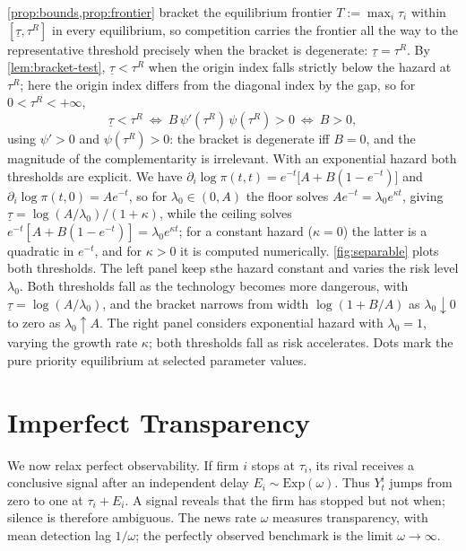 \documentclass[12pt,reqno]{article}
\theoremstyle{definition} \newtheorem{example}{Example}
\theoremstyle{definition} \newtheorem{condition}{Condition}
\theoremstyle{definition} \newtheorem{corollary}{Corollary}
\theoremstyle{definition} \newtheorem{claim}{Claim}
\theoremstyle{definition} \newtheorem{definition}{Definition}
\theoremstyle{definition} \newtheorem{conjecture}{Conjecture}
\theoremstyle{definition} \newtheorem{Lemma}{Lemma}
\theoremstyle{definition} \newtheorem{lemma}{Lemma}
\theoremstyle{plain} \newtheorem{theorem}{Theorem}
\theoremstyle{definition} \newtheorem{assumption}{Assumption}
\theoremstyle{definition} \newtheorem*{assumptionnonumber}{Assumption}
\theoremstyle{definition} \newtheorem*{theoremNoNumber}{Proposition}
\theoremstyle{definition}
\theoremstyle{definition}\newtheorem{proposition}{Proposition}
\theoremstyle{definition} \newtheorem{result}{Result}
\theoremstyle{definition} \newtheorem*{definitionNoNumber}{Definition}
\theoremstyle{definition} \newtheorem{Definition}{Definition}
\theoremstyle{definition} \newtheorem*{DefinitionNoNumber}{Definition}
\theoremstyle{definition} \newtheorem*{fact}{Fact}
\theoremstyle{definition} \newtheorem*{property}{Property}
\theoremstyle{definition} \newtheorem{remark}{Remark}
\begin{document}
\cref{prop:bounds,prop:frontier} bracket the equilibrium frontier $T:=\max_i\tau_i$ within $[\underline\tau,\tau^R]$ in every equilibrium, so competition carries the frontier all the way to the representative threshold precisely when the bracket is degenerate: $\underline\tau=\tau^R$. By \cref{lem:bracket-test}, $\underline\tau<\tau^R$  when the origin index falls strictly below the hazard at $\tau^R$; here the origin index differs from the diagonal index by the gap, so for $0<\tau^R<+\infty$,
\[
\underline\tau<\tau^R
\ \Longleftrightarrow\
B\,\psi'(\tau^R)\,\psi(\tau^R)>0
\ \Longleftrightarrow\
B>0 ,
\]
using $\psi'>0$ and $\psi(\tau^R)>0$: the bracket is degenerate iff $B=0$, and the magnitude of the complementarity is irrelevant. With an exponential hazard both thresholds are explicit. We have
$\partial_i\log\pi(t,t)=e^{-t}\big[A+B(1-e^{-t})\big]$ and
$\partial_i\log\pi(t,0)=Ae^{-t}$,
so for $\lambda_0\in(0,A)$ the floor solves $Ae^{-t}=\lambda_0e^{\kappa t}$, giving $\underline\tau=\log(A/\lambda_0)/(1+\kappa)$, while the ceiling solves $e^{-t}[A+B(1-e^{-t})]=\lambda_0e^{\kappa t}$; for a constant hazard ($\kappa=0$) the latter is a quadratic in $e^{-t}$, and for $\kappa>0$ it is computed numerically. \cref{fig:separable} plots both thresholds. The left panel keep sthe hazard constant and varies the risk level $\lambda_0$. Both thresholds fall as the technology becomes more dangerous, with $\underline\tau=\log(A/\lambda_0)$, and the bracket narrows from width $\log(1+B/A)$ as $\lambda_0\downarrow0$ to zero as $\lambda_0\uparrow A$. The right panel considers exponential hazard with $\lambda_0=1$, varying the growth rate $\kappa$; both thresholds fall as risk accelerates. Dots mark the pure priority equilibrium at selected parameter values. 





\section{Imperfect Transparency}\label{sec:imperfect}
We now relax perfect observability. If firm $i$ stops at $\tau_i$, its rival receives a conclusive signal after an independent delay $E_i
\sim \mathrm{Exp}(\omega)$. Thus $Y_{t}^i$ jumps from zero to one at $\tau_i +E_i$.  A signal reveals that the firm has stopped but not when; silence is therefore ambiguous. The news rate $\omega$ measures transparency, with mean detection lag $1/\omega$; the perfectly observed benchmark is the limit $\omega\to\infty$.
\end{document}

